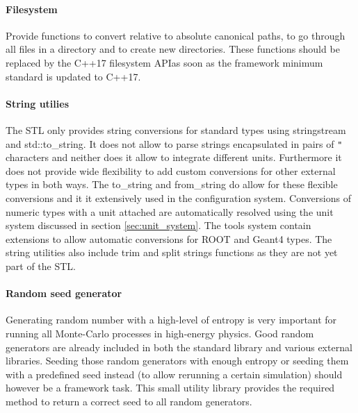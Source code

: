 \paragraph{Filesystem}
\label{sec:filesystem}
Provide functions to convert relative to absolute canonical paths, to go through all files in a directory and to create new directories. These functions should be replaced by the C++17 filesystem API\needcite as soon as the framework minimum standard is updated to C++17.

\paragraph{String utilies}
\label{sec:string_utilities}
The STL only provides string conversions for standard types using stringstream and std::to\_string. It does not allow to parse strings encapsulated in pairs of \texttt{"} characters and neither does it allow to integrate different units. Furthermore it does not provide wide flexibility to add custom conversions for other external types in both ways. The \apsq to\_string and from\_string do allow for these flexible conversions and it it extensively used in the configuration system. Conversions of numeric types with a unit attached are automatically resolved using the unit system discussed in section \ref{sec:unit_system}. The \apsq tools system contain extensions to allow automatic conversions for ROOT and Geant4 types. The string utilities also include trim and split strings functions as they are not yet part of the STL.

\paragraph{Random seed generator}
\label{sec:random_generator}
Generating random number with a high-level of entropy is very important for running all Monte-Carlo processes in high-energy physics. Good random generators are already included in both the standard library and various external libraries. Seeding those random generators with enough entropy or seeding them with a predefined seed instead (to allow rerunning a certain simulation) should however be a framework task. This small utility library provides the required method to return a correct seed to all random generators.

